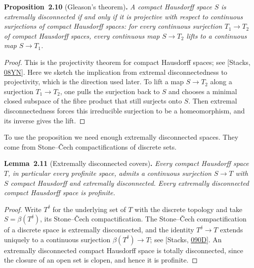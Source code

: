 \documentclass[11pt]{article}
\newenvironment{bpstatement}[2]{\par\addvspace{0.6\baselineskip}\noindent\textbf{#1}#2\textbf{.}\enspace\ignorespaces}
  {\par\addvspace{0.4\baselineskip}}
\newenvironment{bpstatementit}[2]{\begin{bpstatement}{#1}{#2}\itshape\ignorespaces}{\end{bpstatement}}
\begin{document}
\label{bp30}%
\begin{bpstatementit}{Proposition~2.10}{ (Gleason's theorem)}
A compact Hausdorff space \(S\) is extremally disconnected if and only if it is projective with respect to continuous surjections of compact Hausdorff spaces: for every continuous surjection \(T_1\to T_2\) of compact Hausdorff spaces, every continuous map \(S\to T_2\) lifts to a continuous map \(S\to T_1\).
\end{bpstatementit}

\begin{proof}[{Proof}]\label{bp31}%
This is the projectivity theorem for compact Hausdorff spaces; see [Stacks, \href{https://stacks.math.columbia.edu/tag/08YN}{08YN}]. Here we sketch the implication from extremal disconnectedness to projectivity, which is the direction used later. To lift a map \(S\to T_2\) along a surjection \(T_1\to T_2\), one pulls the surjection back to \(S\) and chooses a minimal closed subspace of the fibre product that still surjects onto \(S\). Then extremal disconnectedness forces this irreducible surjection to be a homeomorphism, and its inverse gives the lift.
\end{proof}

\label{bp32}%
To use the proposition we need enough extremally disconnected spaces. They come from Stone–Čech compactifications of discrete sets.

\label{bp33}%
\begin{bpstatementit}{Lemma~2.11}{ (Extremally disconnected covers)}
Every compact Hausdorff space \(T\), in particular every profinite space, admits a continuous surjection \(S\to T\) with \(S\) compact Hausdorff and extremally disconnected. Every extremally disconnected compact Hausdorff space is profinite.
\end{bpstatementit}

\begin{proof}[{Proof}]\label{bp34}%
Write \(T^{\delta}\) for the underlying set of \(T\) with the discrete topology and take \(S=\beta(T^{\delta})\), its Stone–Čech compactification. The Stone–Čech compactification of a discrete space is extremally disconnected, and the identity \(T^{\delta}\to T\) extends uniquely to a continuous surjection \(\beta(T^{\delta})\to T\); see [Stacks, \href{https://stacks.math.columbia.edu/tag/090D}{090D}]. An extremally disconnected compact Hausdorff space is totally disconnected, since the closure of an open set is clopen, and hence it is profinite.
\end{proof}
\end{document}
